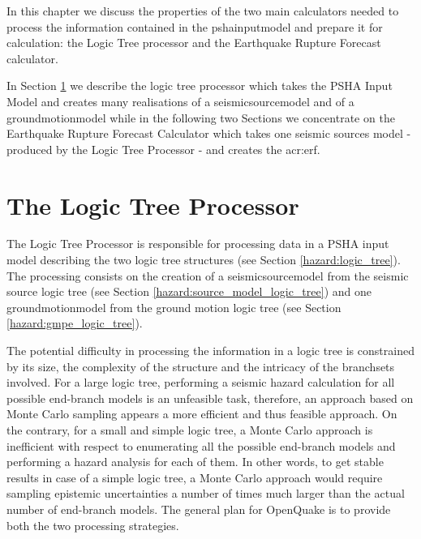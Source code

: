 In this chapter we discuss the properties of the two main calculators 
needed to process the information contained in the \gls{pshainputmodel} 
and prepare it for calculation: the Logic Tree processor and the 
Earthquake Rupture Forecast calculator. 

In Section \ref{hazard:logic_tree_processor} we describe the logic 
tree processor which takes the PSHA Input Model and creates many 
realisations of a \gls{seismicsourcemodel} and of a 
\gls{groundmotionmodel} while in the following two Sections we concentrate 
on the Earthquake Rupture Forecast Calculator which takes one seismic
sources model - produced by the Logic Tree Processor - and creates 
the \gls{acr:erf}.  
%
\section{The Logic Tree Processor}
\label{hazard:logic_tree_processor}
%
The Logic Tree Processor is responsible for processing data in a 
PSHA input model describing the two logic tree structures
(see Section \ref{hazard:logic_tree}). 
%
The processing consists on the creation of a \gls{seismicsourcemodel} 
from the seismic source logic tree (see Section 
\ref{hazard:source_model_logic_tree}) and one \gls{groundmotionmodel} 
from the ground motion logic tree (see Section \ref{hazard:gmpe_logic_tree}). 
%

The potential difficulty in processing the information in a logic tree 
is constrained by its size, the complexity of the structure and the 
intricacy of the \glspl{branchset} involved.
%
For a large logic tree, performing a seismic hazard calculation for 
all possible end-branch models is an unfeasible task, therefore, 
an approach based on Monte Carlo sampling appears a more efficient and
thus feasible approach. 
%
On the contrary, for a small and simple logic tree, a Monte Carlo 
approach is inefficient with respect to enumerating all the possible 
end-branch models and performing a hazard analysis for each of them. 
%
In other words, to get stable results in case of a simple logic tree, 
a Monte Carlo approach would require sampling epistemic uncertainties 
a number of times much larger than the actual number of end-branch models.
%
The general plan for OpenQuake is to provide both the two processing 
strategies. 

